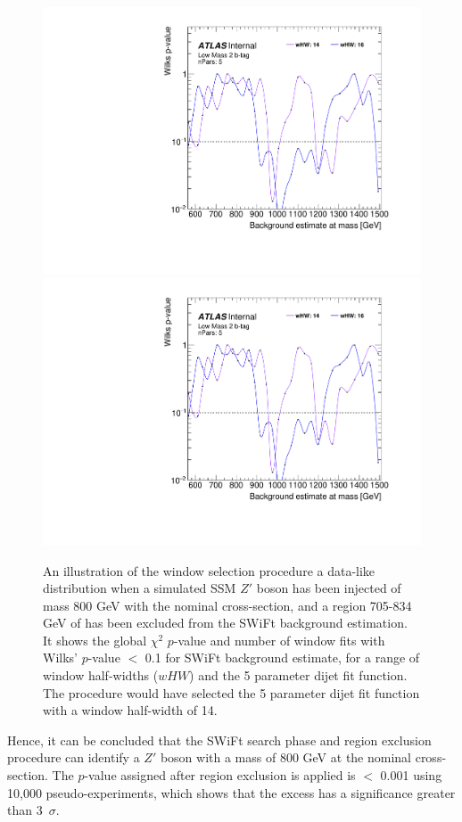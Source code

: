 \begin{figure}[!htb]
\captionsetup[subfigure]{aboveskip=0pt,justification=centering}
\centering
{} {
  \includegraphics[width=0.49\linewidth, angle=0,page=6]{figs/Dibjet/LowMass/FitStudy_min566/windowSel_corrFitCR_dataLike_v11_Zprimebb800_xsFactor1_removeWindow.pdf}
}\hspace{-8mm}
 {
  \includegraphics[width=0.49\linewidth, angle=0,page=8]{figs/Dibjet/LowMass/FitStudy_min566/windowSel_corrFitCR_dataLike_v11_Zprimebb800_xsFactor1_removeWindow.pdf}
}

\caption{\label{fig:windowSel_Zprimebb800_xsFactor1}
  An illustration of the window selection procedure a data-like distribution when
  a simulated SSM $Z'$ boson has been injected of mass 800 GeV with the nominal cross-section,
  and a region 705-834 GeV of has been excluded from the SWiFt background estimation.
  It shows the global $\chi^{2}$ \mbox{$p$-value} %
  and number of window fits with Wilks' \mbox{$p$-value} $<$ 0.1 for SWiFt background estimate,
  for a range of window half-widths ($wHW$) and the 5 parameter dijet fit function.
  The procedure would have selected the 5 parameter dijet fit function with a window half-width of 14.
}
\end{figure}

Hence, it can be concluded that the SWiFt search phase and region exclusion procedure can identify
a $Z'$ boson with a mass of 800 GeV at the nominal cross-section.
The \bh{} $p$-value assigned after region exclusion is applied is $<$ 0.001 using 10,000 pseudo-experiments,
which shows that the excess has a significance greater than 3~$\sigma$.

